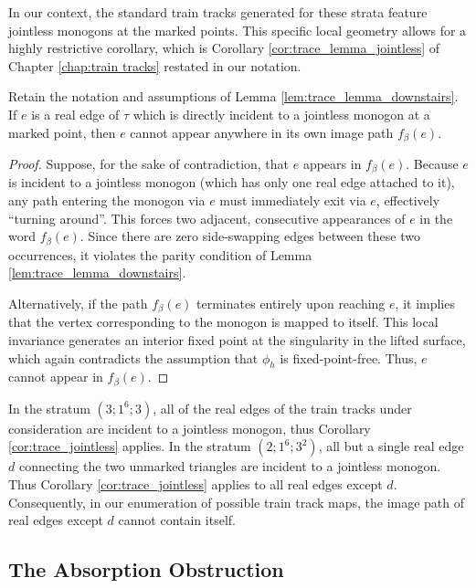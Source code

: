 In our context, the standard train tracks generated for these strata feature jointless monogons at the marked points. This specific local geometry allows for a highly restrictive corollary, which is Corollary \ref{cor:trace_lemma_jointless} of Chapter \ref{chap:train tracks} restated in our notation.

\begin{corollary}\label{cor:trace_jointless}
Retain the notation and assumptions of Lemma \ref{lem:trace_lemma_downstairs}. If $e$ is a real edge of $\tau$ which is directly incident to a jointless monogon at a marked point, then $e$ cannot appear anywhere in its own image path $f_\beta(e)$.
\end{corollary}

\begin{proof}
Suppose, for the sake of contradiction, that $e$ appears in $f_\beta(e)$. Because $e$ is incident to a jointless monogon (which has only one real edge attached to it), any path entering the monogon via $e$ must immediately exit via $e$, effectively ``turning around''. This forces two adjacent, consecutive appearances of $e$ in the word $f_\beta(e)$. Since there are zero side-swapping edges between these two occurrences, it violates the parity condition of Lemma \ref{lem:trace_lemma_downstairs}.

Alternatively, if the path $f_\beta(e)$ terminates entirely upon reaching $e$, it implies that the vertex corresponding to the monogon is mapped to itself. This local invariance generates an interior fixed point at the singularity in the lifted surface, which again contradicts the assumption that $\phi_h$ is fixed-point-free. Thus, $e$ cannot appear in $f_\beta(e)$.
\end{proof}

In the stratum $(3;1^6;3)$, all of the real edges of the train tracks under consideration are incident to a jointless monogon, thus Corollary \ref{cor:trace_jointless} applies. In the stratum $(2;1^6;3^2)$, all but a single real edge $d$ connecting the two unmarked triangles are incident to a jointless monogon. Thus Corollary \ref{cor:trace_jointless} applies to all real edges except $d$. Consequently, in our enumeration of possible train track maps, the image path of real edges except $d$ cannot contain itself.

\subsection{The Absorption Obstruction}
\label{subsec:absorption_obstruction}

